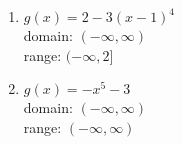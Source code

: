 \documentclass{ximera}
\begin{document}
\begin{multicols}{2}
\begin{enumerate}
\setcounter{enumi}{\value{HW}}


\item $g(x) = 2 - 3(x - 1)^{4}$\\
domain: $(-\infty, \infty)$\\
range: $(-\infty, 2]$\\



\vfill

\columnbreak

\item $g(x) = -x^{5} - 3$\\
domain: $(-\infty, \infty)$\\
range: $(-\infty, \infty)$\\



\setcounter{HW}{\value{enumi}}
\end{enumerate}
\end{multicols}


\pagebreak
\end{document}
